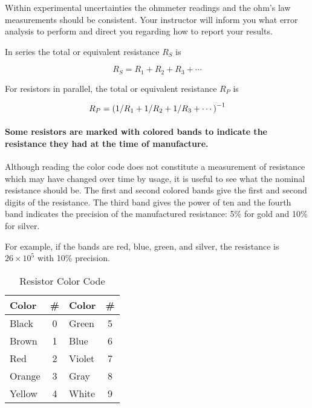 
Within experimental uncertainties the ohmmeter readings and the ohm's law measurements should be consistent.  Your instructor will inform you what error analysis to perform and direct you regarding how to report your results.

In series the total or equivalent resistance $R_S$ is 

\begin{equation} \label{e:ser}
	R_S  =  R_1  +  R_2  +  R_3  + \cdots	
\end{equation}

For resistors in parallel, the total or equivalent resistance $R_P$ is

\begin{equation} \label{e:par}
	R_P  =  \left (1/R_1  +  1/R_2  +  1/R_3  + \cdots \right)\relax^{-1}
\end{equation}

\paragraph {Some resistors are marked with colored bands to indicate the resistance they had at the time of manufacture.}  Although reading the color code does not constitute a measurement of resistance which may have changed over time by usage, it is useful to see what the nominal resistance should be.  The first and second colored bands give the first and second digits of the resistance.  The third band gives the power of ten and the fourth band indicates the precision of the manufactured resistance:  5\% for gold and  10\% for silver.

For example, if the bands are red, blue, green, and silver, the resistance is $26 \times 10^5$ with 10\% precision.

\begin{table}
\caption{Resistor Color Code}
\centering
\begin{tabular}{l c l c}Color & \# & Color & \# \\
\hline
Black	&	0 &	Green	& 5\\
Brown	&	1 &	Blue	& 6\\
Red		&	2 &	Violet	& 7\\
Orange	&	3 &	Gray	& 8\\
Yellow	&	4 &	White	& 9\\
\end{tabular}
\end{table}

